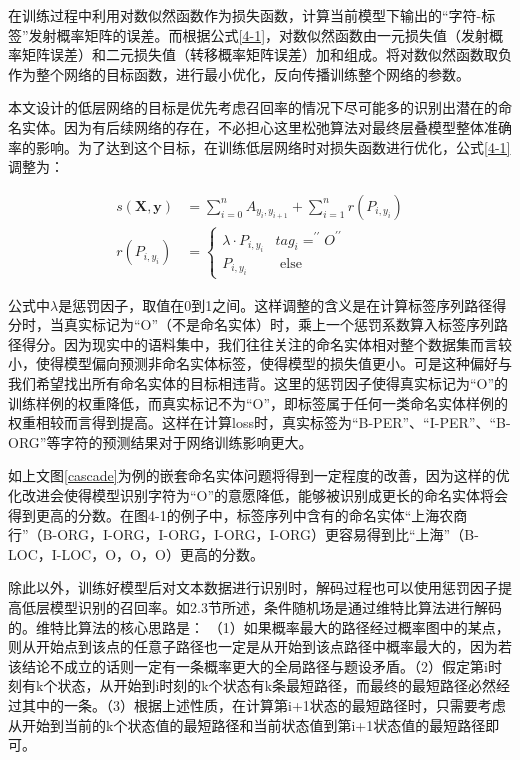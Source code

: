 \documentclass[winfonts,master,oneside,nobackinfo]{njuthesis}
\begin{document}
在训练过程中利用对数似然函数作为损失函数，计算当前模型下输出的“字符-标签”发射概率矩阵的误差。而根据公式\ref{4-1}，对数似然函数由一元损失值（发射概率矩阵误差）和二元损失值（转移概率矩阵误差）加和组成。将对数似然函数取负作为整个网络的目标函数，进行最小优化，反向传播训练整个网络的参数。

本文设计的低层网络的目标是优先考虑召回率的情况下尽可能多的识别出潜在的命名实体。因为有后续网络的存在，不必担心这里松弛算法对最终层叠模型整体准确率的影响。为了达到这个目标，在训练低层网络时对损失函数进行优化，公式\ref{4-1}调整为：

\begin{equation} 
\begin{split}
s(\bm{X}, \bm{y})&=\sum_{i=0}^{n} A_{y_{i}, y_{i+1}}+\sum_{i=1}^{n} r(P_{i, y_{i}}) \\ 
r\left(P_{i, y_{i}}\right)&=\left\{\begin{array}{ll}{\lambda \cdot P_{i, y_{i}}} & {t a g_{i}=^{\prime \prime} O^{\prime \prime}} \\ {P_{i, y_{i}}} & {\text { else }}\end{array}\right.
\end{split}
\end{equation}

公式中$\lambda$是惩罚因子，取值在0到1之间。这样调整的含义是在计算标签序列路径得分时，当真实标记为“O”（不是命名实体）时，乘上一个惩罚系数算入标签序列路径得分。因为现实中的语料集中，我们往往关注的命名实体相对整个数据集而言较小，使得模型偏向预测非命名实体标签，使得模型的损失值更小。可是这种偏好与我们希望找出所有命名实体的目标相违背。这里的惩罚因子使得真实标记为“O”的训练样例的权重降低，而真实标记不为“O”，即标签属于任何一类命名实体样例的权重相较而言得到提高。这样在计算loss时，真实标签为“B-PER”、“I-PER”、“B-ORG”等字符的预测结果对于网络训练影响更大。

如上文图\ref{cascade}为例的嵌套命名实体问题将得到一定程度的改善，因为这样的优化改进会使得模型识别字符为“O”的意愿降低，能够被识别成更长的命名实体将会得到更高的分数。在图4-1的例子中，标签序列中含有的命名实体“上海农商行”（B-ORG，I-ORG，I-ORG，I-ORG，I-ORG）更容易得到比“上海”（B-LOC，I-LOC，O，O，O）更高的分数。

除此以外，训练好模型后对文本数据进行识别时，解码过程也可以使用惩罚因子提高低层模型识别的召回率。如2.3节所述，条件随机场是通过维特比算法进行解码的。维特比算法的核心思路是： （1）如果概率最大的路径经过概率图中的某点，则从开始点到该点的任意子路径也一定是从开始到该点路径中概率最大的，因为若该结论不成立的话则一定有一条概率更大的全局路径与题设矛盾。（2）假定第i时刻有k个状态，从开始到i时刻的k个状态有k条最短路径，而最终的最短路径必然经过其中的一条。（3）根据上述性质，在计算第i+1状态的最短路径时，只需要考虑从开始到当前的k个状态值的最短路径和当前状态值到第i+1状态值的最短路径即可。
\end{document}
